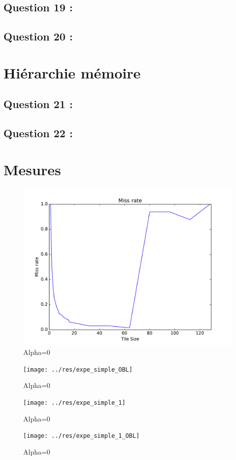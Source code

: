 \documentclass[11pt,a4paper]{article}
\begin{document}
    \subsection{Question 19 :}
    
    \subsection{Question 20 :}
        
\section{Hiérarchie mémoire}
    \subsection{Question 21 :}
    
    \subsection{Question 22 :}
\section{Mesures}
\begin{figure}[htbp]
  \centering
  \includegraphics[width=0.9\linewidth]{../res/expe_simple}
  \caption{Alpha=0}
  \label{fig:0}
\end{figure}
 \begin{figure}[htbp]
   \centering
   \texttt{[image: ../res/expe\_simple\_OBL]}
   \caption{Alpha=0}
   \label{fig:1}
 \end{figure}
\begin{figure}[htbp]
  \centering
  \texttt{[image: ../res/expe\_simple\_1]}
  \caption{Alpha=0}
  \label{fig:0}
\end{figure}
 \begin{figure}[htbp]
   \centering
   \texttt{[image: ../res/expe\_simple\_1\_OBL]}
   \caption{Alpha=0}
   \label{fig:1}
 \end{figure}
\end{document}

